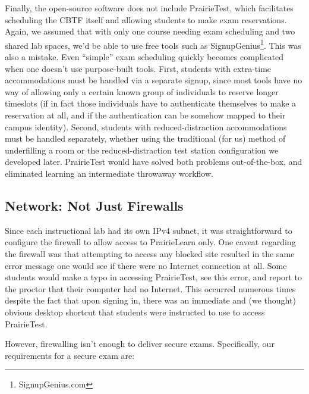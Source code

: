 \label{sec:reservations}
Finally, the open-source software does not include PrairieTest,
which facilitates
scheduling the CBTF itself and allowing students to make exam
reservations.
Again, we assumed that with only one course needing exam scheduling
and two shared lab spaces, we'd be able to use free tools such as
SignupGenius\footnote{SignupGenius.com}.  This was also a mistake.
Even ``simple'' exam scheduling quickly becomes complicated when one
doesn't use purpose-built tools.
First, students with extra-time accommodations must be handled via a
separate signup, since most tools have no way of allowing only a certain
known group of individuals to reserve longer timeslots (if in fact
those individuals have to authenticate themselves to make a
reservation at all, and if the authentication can be somehow mapped to
their campus identity).
Second, students with reduced-distraction accommodations must be
handled separately, whether using the traditional (for us) method of underfilling
a room or the reduced-distraction test
station configuration we developed later.
PrairieTest would have solved both problems out-of-the-box,
and eliminated learning an intermediate throwaway workflow.

\subsection{Network: Not Just Firewalls}
\label{sec:networking}


Since each instructional lab had its own IPv4 subnet,
it was straightforward to configure the firewall to allow access to
PrairieLearn only.
One
caveat regarding the firewall was that attempting to access
any blocked site resulted in the same error message one would see if
there were no Internet connection at all.
Some students would make a typo in accessing PrairieTest, see this error, and report to the proctor that their
computer had no Internet.  This occurred numerous times despite the
fact that upon signing in, 
there was an immediate and (we thought) obvious desktop
shortcut that students were instructed to use to access PrairieTest.

However, firewalling isn't enough to deliver secure exams.  
Specifically, our requirements for a secure exam are:


